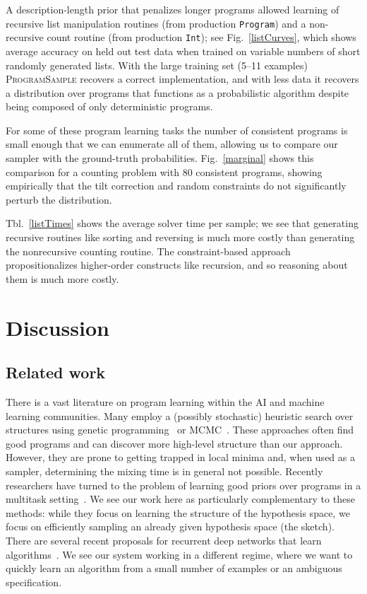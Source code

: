 \documentclass{article}
\newcommand{\theSystem}{\textsc{ProgramSample}}
\begin{document}
A description-length prior that penalizes longer programs allowed learning of recursive list manipulation routines (from production \verb|Program|) and a non-recursive count routine (from production \verb|Int|); see Fig.~\ref{listCurves},
which shows average accuracy on held out test data when trained on variable numbers of short randomly generated lists.
With the large training set (5--11 examples) \theSystem{} recovers a correct implementation,
and with less data it recovers a distribution over programs
that functions as a probabilistic algorithm despite being composed of only deterministic programs.


For some of these program learning tasks the number of consistent programs is small enough that we can enumerate all of them, allowing us to compare our sampler with the ground-truth probabilities.
Fig.~\ref{marginal} shows this comparison for a counting problem with 80 consistent programs, showing empirically that the tilt correction and random constraints do not significantly perturb the distribution.

Tbl.~\ref{listTimes} shows the average solver time per sample; we see that generating recursive routines like sorting and reversing is much more costly than generating the nonrecursive counting routine.
The constraint-based approach propositionalizes higher-order constructs like recursion, and so reasoning about them is much more costly.



\pagebreak
\section{Discussion}

\subsection{Related work}
There is a vast literature on program learning within the AI and machine learning communities.
Many employ a (possibly stochastic) heuristic search over structures using genetic programming~\cite{DBLP:books/daglib/0070933} or MCMC~\cite{schkufza2013stochastic}.
These approaches often find good programs and can discover more high-level structure than our approach.
However, they are prone to getting trapped in local minima
and, when used as a sampler, determining the mixing time is in general not possible.
Recently researchers have turned to the problem of learning good priors over programs in a multitask setting~\cite{DBLP:conf/icml/LiangJK10,menon2013machine,Dechter:2013:BLV:2540128.2540316}.
We see our work here as particularly complementary to these methods: while they focus on learning the structure of the hypothesis space,
we focus on efficiently sampling an already given hypothesis space (the sketch).
There are several recent proposals for recurrent deep networks that learn algorithms~\cite{DBLP:journals/corr/ReedF15,graves2014neural}.
We see our system working in a different regime,
where we want to quickly learn an algorithm from a small number of examples or an ambiguous specification.
\end{document}
